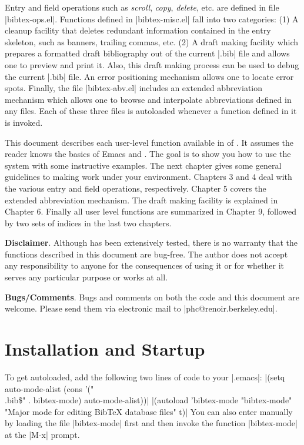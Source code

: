 Entry and field operations such as {\it scroll\/},
{\it copy\/}, {\it delete\/}, etc. are defined in file |bibtex-ops.el|.
Functions defined in |bibtex-misc.el| fall into two categories:
(1) A cleanup facility that deletes redundant information contained in the
entry skeleton, such as banners, trailing commas, etc.
(2) A draft making facility which prepares a formatted draft
bibliography out of the current |.bib| file and allows one to preview
and print it.  Also, this draft making process can be used to debug
the current |.bib| file.  An error positioning mechanism allows one to
locate error spots.  Finally, the file |bibtex-abv.el| includes
an extended abbreviation mechanism which allows one to browse and 
interpolate abbreviations defined in any files.
Each of these three files is autoloaded whenever a function defined in it
is invoked.

This document describes each user-level function available in {\version} of
{\BM}.  It assumes the reader knows the basics of Emacs and {\BibTeX}.
The goal is to show you how to use the system with some instructive examples.
The next chapter gives some general guidelines to making
{\BM} work under your environment.  Chapters 3 and 4 deal with the various
entry and field operations, respectively.  Chapter 5 covers
the extended abbreviation mechanism.  The draft making
facility is explained in Chapter 6.
Finally all user level functions are summarized in Chapter 9, followed
by two sets of indices in the last two chapters.

{\bf Disclaimer}.  Although {\BM} has been extensively tested,
there is no warranty that the functions described in this document
are bug-free.  The author does not accept any responsibility to anyone
for the consequences of using it or for whether it serves any particular
purpose or works at all.

{\bf Bugs/Comments}.  Bugs and comments on both the code and this
document are welcome.  Please send them via electronic mail to
|phc@renoir.berkeley.edu|.



\chapter{Installation and Startup}

\noindent
To get {\BM} autoloaded, add the following two lines of code to your
|.emacs|:
\begindisplay
 |(setq auto-mode-alist (cons '("\\.bib\$" . bibtex-mode) auto-mode-alist))|\cr
 |(autoload 'bibtex-mode "bibtex-mode" "Major mode for editing BibTeX database
 files" t)|\cr
\enddisplay
You can also enter {\BM} manually by loading the file |bibtex-mode| first and
then invoke the function |bibtex-mode| at the |M-x| prompt.


